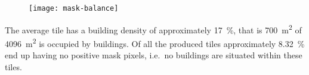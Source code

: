 \begin{figure}[H]
  \centering
  \texttt{[image: mask-balance]}
  \label{fig:mask-class-balance}
\end{figure}

The average tile has a building density of approximately \SI{17}{\percent}, that is \SI{700}{\meter\squared} of \SI{4096}{\meter\squared} is occupied by buildings.
Of all the produced tiles approximately \SI{8.32}{\percent} end up having no positive mask pixels, i.e.\ no buildings are situated within these tiles.
